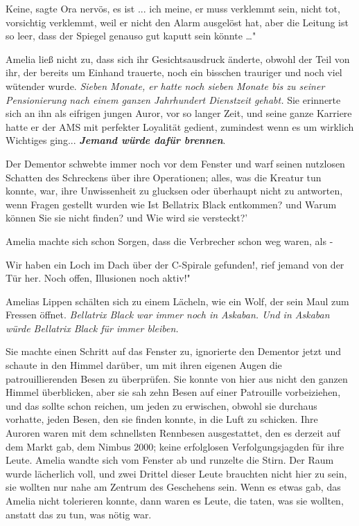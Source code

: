 \glqq Keine\grqq{}, sagte Ora nervös, \glqq es ist ... ich meine, er muss
verklemmt sein, nicht tot, vorsichtig verklemmt, weil er nicht den Alarm
ausgelöst hat, aber die Leitung ist so leer, dass der Spiegel genauso gut kaputt
sein könnte …"

Amelia ließ nicht zu, dass sich ihr Gesichtsausdruck änderte, obwohl der Teil
von ihr, der bereits um Einhand trauerte, noch ein bisschen trauriger und noch
viel wütender wurde. \emph{Sieben Monate, er hatte noch sieben Monate bis zu
seiner Pensionierung nach einem ganzen Jahrhundert Dienstzeit gehabt.} Sie
erinnerte sich an ihn als eifrigen jungen Auror, vor so langer Zeit, und seine
ganze Karriere hatte er der AMS mit perfekter Loyalität gedient, zumindest wenn
es um wirklich Wichtiges ging... \textbf{\emph{Jemand würde dafür brennen}}.

Der Dementor schwebte immer noch vor dem Fenster und warf seinen nutzlosen
Schatten des Schreckens über ihre Operationen; alles, was die Kreatur tun
konnte, war, ihre Unwissenheit zu glucksen oder überhaupt nicht zu antworten,
wenn Fragen gestellt wurden wie \glqq Ist Bellatrix Black entkommen?\grqq{} und
\glqq Warum können Sie sie nicht finden?\grqq{} und \glqq Wie wird sie
versteckt?'

Amelia machte sich schon Sorgen, dass die Verbrecher schon weg waren, als -

\glqq Wir haben ein Loch im Dach über der C-Spirale gefunden!\grqq{}, rief
jemand von der Tür her. \glqq Noch offen, Illusionen noch aktiv!"

Amelias Lippen schälten sich zu einem Lächeln, wie ein Wolf, der sein Maul zum
Fressen öffnet. \emph{Bellatrix Black war immer noch in Askaban. Und in Askaban
würde Bellatrix Black für immer bleiben.}

Sie machte einen Schritt auf das Fenster zu, ignorierte den Dementor jetzt und
schaute in den Himmel darüber, um mit ihren eigenen Augen die patrouillierenden
Besen zu überprüfen. Sie konnte von hier aus nicht den ganzen Himmel
überblicken, aber sie sah zehn Besen auf einer Patrouille vorbeiziehen, und das
sollte schon reichen, um jeden zu erwischen, obwohl sie durchaus vorhatte, jeden
Besen, den sie finden konnte, in die Luft zu schicken. Ihre Auroren waren mit
dem schnellsten Rennbesen ausgestattet, den es derzeit auf dem Markt gab, dem
Nimbus 2000; keine erfolglosen Verfolgungsjagden für ihre Leute. Amelia wandte
sich vom Fenster ab und runzelte die Stirn. Der Raum wurde lächerlich voll, und
zwei Drittel dieser Leute brauchten nicht hier zu sein, sie wollten nur nahe am
Zentrum des Geschehens sein. Wenn es etwas gab, das Amelia nicht tolerieren
konnte, dann waren es Leute, die taten, was sie wollten, anstatt das zu tun, was
nötig war.

